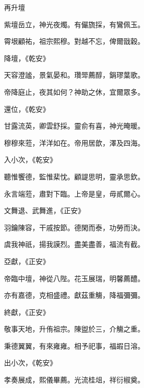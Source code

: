 \begin{pinyinscope}
 再升壇



 紫壇岳立，神光夜燭。有儼旒採，有鸞佩玉。



 霄垠顧祐，祖宗熙穆。對越不忘，俾爾戩穀。



 降壇，《乾安》



 天容澄謐，景氣晏和。瓚斝薦醇，鋗璆葉歌。



 帝降庭止，夜其如何？神助之休，宜爾眾多。



 還位，《乾安》



 甘露流英，卿雲舒採。靈俞有喜，神光晻暖。



 穆穆來蒞，洋洋如在。帝用居歆，澤及四海。



 入小次，《乾安》



 聽惟饗德，監惟棐忱。顧諟思明，靈承思欽。



 永言端蒞，肅對下臨。上帝是皇，毋貳爾心。



 文舞退、武舞進，《正安》



 羽鑰陳容，干戚按節。德閑而泰，功勞而決。



 虞我神祇，揚我謨烈。盡美盡善，福流有截。



 亞獻，《正安》



 帝臨中壇，神從八陛。花玉展瑞，明馨薦醴。



 亦有嘉德，克相盛禮。獻茲重觴，降福彌彌。



 終獻，《正安》



 敬事天地，升侑祖宗。陳盥於三，介觴之重。



 秉德翼翼，有來雍雍。相予祀事，福嘏日溶。



 出小次，《乾安》



 孝奏展成，熙儀畢薦。光流桂俎，祥衍椒奠。




\end{pinyinscope}
